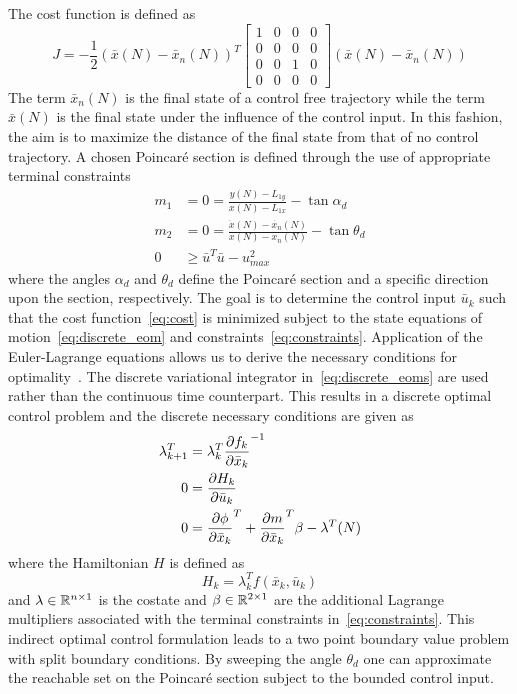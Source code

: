 \documentclass[letterpaper, preprint, paper,11pt]{AAS}	%
\begin{document}
The cost function is defined as
\begin{equation}
	J = -\frac{1}{2} \left( \bar{x}(N) - \bar{x}_{n}(N)\right)^T 
	\left[
	\begin{array}{cccc}
		1 & 0& 0& 0 \\
		 0& 0& 0& 0\\
		 0 & 0 & 1 &0\\
		 0 & 0& 0& 0
	\end{array}
	\right]
	\left( \bar{x}(N) - \bar{x}_{n}(N)\right)
	\label{eq:cost}
\end{equation}
The term \( \bar{x}_n(N) \) is the final state of a control free trajectory while the term \( \bar{x}(N) \) is the final state under the influence of the control input.
In this fashion, the aim is to maximize the distance of the final state from that of no control trajectory. 
A chosen Poincar\'e section is defined through the use of appropriate terminal constraints
\begin{subequations}
\begin{align}
    m_1 &= 0 = \frac{y(N) - L_{1y}}{x(N) - L_{1x}} - \tan{\alpha_d} \\ 
    m_2&= 0 = \frac{\dot{x}(N) - \dot{x_n}(N) }{x(N) -x_n(N) } - \tan{\theta_d} \\
	 0 &\geq\bar{u}^T \bar{u} - u_{max}^2 
\end{align}
    \label{eq:constraints}
\end{subequations}
where the angles \( \alpha_d\) and \( \theta_d\) define the Poincar\'e section and a specific direction upon the section, respectively. 
The goal is to determine the control input \( \bar{u}_k\) such that the cost function~\cref{eq:cost} is minimized subject to the state equations of motion~\cref{eq:discrete_eom} and constraints~\cref{eq:constraints}.
Application of the Euler-Lagrange equations allows us to derive the necessary conditions for optimality~\cite{bryson1975}.
The discrete variational integrator in~\cref{eq:discrete_eoms} are used rather than the continuous time counterpart. 
This results in a discrete optimal control problem and the discrete necessary conditions are given as
\begin{subequations}\label{eq:necc_cond}
\begin{align}
	\lambda_{k+1}^T &= \lambda_k^T  \frac{\partial f_k}{\partial \bar{x}_k}^{-1} \\
	0 &=  \frac{\partial H_k}{\partial \bar{u}_k} \\
	0 &= \frac{\partial \phi}{\partial \bar{x}_k}^T + \frac{\partial m}{\partial \bar{x}_k}^T\beta  - \lambda^T(N)  
\end{align}
\end{subequations}
where the Hamiltonian \(H\) is defined as
\begin{equation}
	H_k = \lambda_k^T f(\bar{x}_k, \bar{u}_k) 
	\label{eq:hamiltonian_opt}
\end{equation}
and \(\lambda \in \mathbb{R}^{n \times 1}\) is the costate and \(\beta \in \mathbb{R}^{2 \times 1} \) are the additional Lagrange multipliers associated with the terminal constraints in~\cref{eq:constraints}.
This indirect optimal control formulation leads to a two point boundary value problem with split boundary conditions. 
By sweeping the angle \( \theta_d \) one can approximate the reachable set on the Poincar\'e section subject to the bounded control input. 
\end{document}
